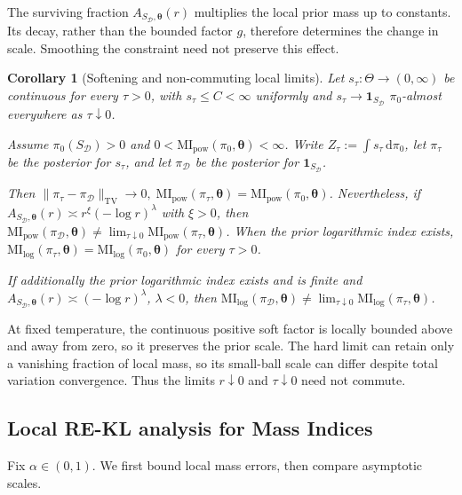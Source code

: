 \documentclass[11pt,a4paper]{article}
\newcommand{\MI}{\mathrm{MI}}
\newcommand{\pa}{\boldsymbol\theta}
\theoremstyle{compactplain}
\newtheorem{corollary}[theorem]{Corollary}
\theoremstyle{compactdefinition}
\numberwithin{equation}{section}
\begin{document}
The surviving fraction \(A_{S_{\mathcal D},\pa}(r)\) multiplies the local prior mass up to constants. Its decay, rather than the bounded factor \(g\), therefore determines the change in scale. Smoothing the constraint need not preserve this effect.

\begin{corollary}[Softening and non-commuting local limits]\label{cor:softening-noncommuting}
Let \(s_\tau:\Theta\to(0,\infty)\) be continuous for every \(\tau>0\), with \(s_\tau\le C<\infty\) uniformly and \(s_\tau\to\mathbf1_{S_{\mathcal D}}\) \(\pi_0\)-almost everywhere as \(\tau\downarrow0\). 


Assume \(\pi_0(S_{\mathcal D})>0\) and \(0<\MI_{\mathrm{pow}}(\pi_0,\pa)<\infty\). Write \(Z_\tau:=\int s_\tau\,\mathrm d\pi_0\), let \(\pi_\tau\) be the posterior for \(s_\tau\), and let \(\pi_{\mathcal D}\) be the posterior for \(\mathbf1_{S_{\mathcal D}}\). 

Then
\(\|\pi_\tau-\pi_{\mathcal D}\|_{\mathrm{TV}}\to0, \allowbreak\; \MI_{\mathrm{pow}}(\pi_\tau,\pa)=\MI_{\mathrm{pow}}(\pi_0,\pa)\).
Nevertheless, if \(A_{S_{\mathcal D},\pa}(r)\asymp r^\xi(-\log r)^\lambda\) with \(\xi>0\), then
\(\MI_{\mathrm{pow}}(\pi_{\mathcal D},\pa) \ne\lim_{\tau\downarrow0}\MI_{\mathrm{pow}}(\pi_\tau,\pa)\).
When the prior logarithmic index exists, \(\MI_{\mathrm{log}}(\pi_\tau,\pa)=\MI_{\mathrm{log}}(\pi_0,\pa)\) for every \(\tau>0\). 

If additionally the prior logarithmic index exists and is finite and \(A_{S_{\mathcal D},\pa}(r)\asymp(-\log r)^\lambda\), \(\lambda<0\), then
\(\MI_{\mathrm{log}}(\pi_{\mathcal D},\pa) \ne\lim_{\tau\downarrow0}\MI_{\mathrm{log}}(\pi_\tau,\pa)\).
\end{corollary}

At fixed temperature, the continuous positive soft factor is locally bounded above and away from zero, so it preserves the prior scale. The hard limit can retain only a vanishing fraction of local mass, so its small-ball scale can differ despite total variation convergence. Thus the limits \(r\downarrow0\) and \(\tau\downarrow0\) need not commute.

\subsection{Local RE-KL analysis for Mass Indices}

Fix \(\alpha\in(0,1)\). We first bound local mass errors, then compare asymptotic scales.
\end{document}
